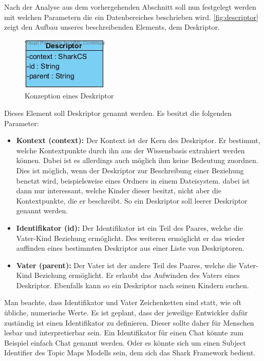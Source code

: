 \documentclass[a4paper]{article}
\begin{document}
	Nach der Analyse aus dem vorhergehenden Abschnitt soll nun festgelegt werden
	mit welchen Parametern die ein Datenbereiches beschrieben wird.
	\autoref{fig:descriptor} zeigt den Aufbau unseres beschreibenden Elements, dem
	Deskriptor.
	
	\begin{figure}[H] 
		\centerline{
			\includegraphics{../Bilder/descriptor.jpg}
		}
		\caption{Konzeption eines Deskriptor}
		\label{fig:descriptor}
	\end{figure}
	
	Dieses Element soll Deskriptor genannt werden. Es besitzt die folgenden
	Parameter:
	
	\begin{itemize}
		\item \textbf{Kontext (context):} Der Kontext ist der Kern des Deskriptor.
		Er bestimmt, welche Kontextpunkte durch ihn aus der Wissensbasis extrahiert
		werden können. Dabei ist es allerdings auch möglich ihm keine Bedeutung 
		zuordnen. Dies ist möglich, wenn der Deskriptor zur	Beschreibung einer
		Beziehung benetzt wird, beispielsweise eines Ordners in einem Dateisystem.
		dabei ist dann nur interessant, welche Kinder dieser besitzt, nicht aber
		die Kontextpunkte, die er beschreibt. So ein Deskriptor soll leerer
		Deskriptor genannt werden.
		\item \textbf{Identifikator (id):} Der Identifikator ist ein Teil des
		Paares, welche die Vater-Kind Beziehung ermöglicht. Des weiteren
		ermöglicht er das wieder auffinden eines bestimmten Deskriptor aus einer
		Liste von Deskriptoren.
		\item \textbf{Vater (parent):} Der Vater ist der andere Teil des Paares,
		welche die Vater-Kind Beziehung ermöglicht. Er erlaubt das Aufwinden des
		Vaters eines Deskriptor. Ebenfalls kann so ein Deskriptor nach seinen
		Kindern	suchen.
	\end{itemize} 	
	
	Man beachte, dass Identifikator und Vater Zeichenketten sind statt, wie
	oft übliche, numerische Werte. Es ist geplant, dass der jeweilige Entwickler
	dafür zuständig ist einen Identifikator zu definieren. Dieser sollte daher
	für Menschen lesbar und interpretierbar sein. Ein Identifikator für einen
	Chat könnte zum Beispiel einfach Chat genannt werden. Oder es könnte sich um
	einen Subject Identifier des Topic Maps Modells sein, dem sich das Shark
	Framework bedient. \\
	
\end{document}
